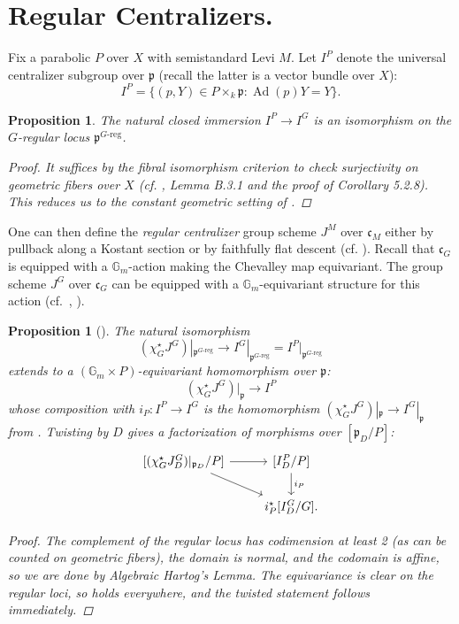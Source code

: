 \documentclass[openany]{amsbook}
\newtheorem{proposition}[theorem]{Proposition}
\theoremstyle{definition}
\theoremstyle{remark}
\numberwithin{equation}{section}
\newcommand{\G}{\mathbb{G}}
\renewcommand{\-}{\operatorname{-}}
\newcommand{\on}[1]{\operatorname{#1}}
\newcommand{\fc}{\mathfrak{c}}
\newcommand{\fp}{\mathfrak{p}}
\newcommand{\Greg}{G\text{-reg}}
\begin{document}
\section{Regular Centralizers.}
Fix a parabolic $P$ over $X$ with semistandard Levi $M$. Let $I^P$ denote the universal centralizer subgroup over $\fp$ (recall the latter is a vector bundle over $X$):
\[
    I^P = \{(p, Y) \in P \times_k \fp : \on{Ad}(p) Y = Y\}.
\]

\begin{proposition}
    The natural closed immersion $I^P \to I^G$ is an isomorphism on the $G$-regular locus $\fp^{\Greg}$.
    \begin{proof}
        It suffices by the fibral isomorphism criterion to check surjectivity on geometric fibers over $X$ (cf. \cite{conradrgs}, Lemma B.3.1 and the proof of Corollary 5.2.8). This reduces us to the constant geometric setting of \cite[Lemme 3.1.1]{CLII}.
    \end{proof}
\end{proposition}

One can then define the \textit{regular centralizer} group scheme $J^M$ over $\fc_M$ either by pullback along a Kostant section or by faithfully flat descent (cf. \cite[2.1.1]{ngofl}). Recall that $\fc_G$ is equipped with a $\G_m$-action making the Chevalley map equivariant. The group scheme $J^G$ over $\fc_G$ can be equipped with a $\G_m$-equivariant structure for this action (cf.\ \cite[\S 2.2.3]{ngofl}, \cite[\S 5.1]{CLII}).

\begin{proposition}[{{\cite[3.2.1]{CLII}}}]\label{prop.reg.to.centralizer}
    The natural isomorphism
    $$
    (\chi_G^\star J^G)|_{\fp^{\Greg}} \to I^G|_{\fp^{\Greg}} = I^P|_{\fp^{\Greg}}$$
    extends to a $(\G_m \times P)$-equivariant homomorphism over $\fp$:
    $$
    (\chi_G^\star J^G)|_{\fp} \to I^P
    $$
    whose composition with $i_P : I^P \to I^G$ is the homomorphism $(\chi_G^\star J^G)|_{\fp} \to I^G|_{\fp}$ from \cite[2.1.1]{ngofl}. Twisting by $D$ gives a factorization of morphisms over $[\fp_D/P]$:
    $$
        \begin{tikzcd}[ampersand replacement=\&]
        {[(\chi_G^\star J_D^G)|_{\fp_D}/P]} \ar[r] \ar[dr] \& {[I_D^P/P]} \ar[d, "i_P"] \\
        \& {i_P^\star [I_D^G/G]}.
        \end{tikzcd}
    $$
    \begin{proof}
        The complement of the regular locus has codimension at least 2 (as can be counted on geometric fibers), the domain is normal, and the codomain is affine, so we are done by Algebraic Hartog's Lemma. The equivariance is clear on the regular loci, so holds everywhere, and the twisted statement follows immediately.
    \end{proof}
\end{proposition}
\end{document}
